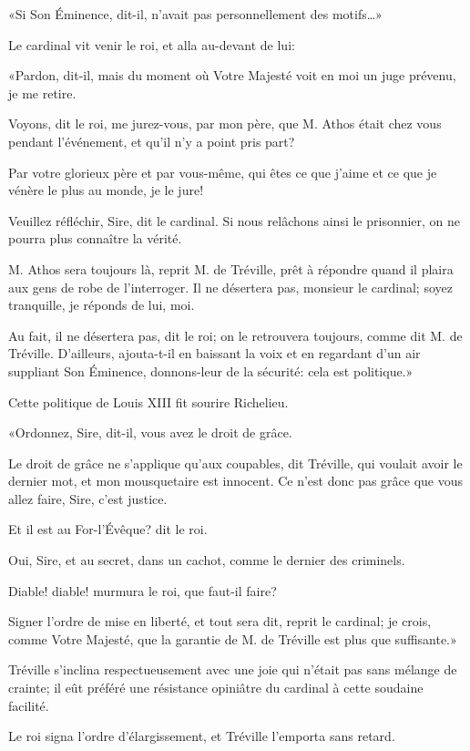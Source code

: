 «Si Son Éminence, dit-il, n'avait pas personnellement des motifs\dots» 

Le cardinal vit venir le roi, et alla au-devant de lui: 

«Pardon, dit-il, mais du moment où Votre Majesté voit en moi un juge prévenu, je me retire. 

\speak  Voyons, dit le roi, me jurez-vous, par mon père, que M. Athos était chez vous pendant l'événement, et qu'il n'y a point pris part? 

\speak  Par votre glorieux père et par vous-même, qui êtes ce que j'aime et ce que je vénère le plus au monde, je le jure! 

\speak  Veuillez réfléchir, Sire, dit le cardinal. Si nous relâchons ainsi le prisonnier, on ne pourra plus connaître la vérité. 

\speak  M. Athos sera toujours là, reprit M. de Tréville, prêt à répondre quand il plaira aux gens de robe de l'interroger. Il ne désertera pas, monsieur le cardinal; soyez tranquille, je réponds de lui, moi. 

\speak  Au fait, il ne désertera pas, dit le roi; on le retrouvera toujours, comme dit M. de Tréville. D'ailleurs, ajouta-t-il en baissant la voix et en regardant d'un air suppliant Son Éminence, donnons-leur de la sécurité: cela est politique.» 

Cette politique de Louis XIII fit sourire Richelieu. 

«Ordonnez, Sire, dit-il, vous avez le droit de grâce. 

\speak  Le droit de grâce ne s'applique qu'aux coupables, dit Tréville, qui voulait avoir le dernier mot, et mon mousquetaire est innocent. Ce n'est donc pas grâce que vous allez faire, Sire, c'est justice. 

\speak  Et il est au For-l'Évêque? dit le roi. 

\speak  Oui, Sire, et au secret, dans un cachot, comme le dernier des criminels. 

\speak  Diable! diable! murmura le roi, que faut-il faire? 

\speak  Signer l'ordre de mise en liberté, et tout sera dit, reprit le cardinal; je crois, comme Votre Majesté, que la garantie de M. de Tréville est plus que suffisante.» 

Tréville s'inclina respectueusement avec une joie qui n'était pas sans mélange de crainte; il eût préféré une résistance opiniâtre du cardinal à cette soudaine facilité. 

Le roi signa l'ordre d'élargissement, et Tréville l'emporta sans retard. 

